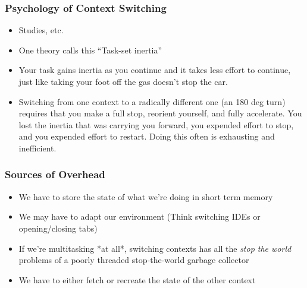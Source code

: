 \documentclass{beamer}
\begin{document}


\begin{frame}
\frametitle{Psychology of Context Switching}
\begin{itemize}
  \item Studies, etc.
  \item One theory calls this ``Task-set inertia''
  \item Your task gains inertia as you continue and it takes less effort to continue, just like taking your foot off the gas doesn't stop the car.
  \item Switching from one context to a radically different one (an 180 deg turn) requires that you make a full stop, reorient yourself, and fully accelerate. You lost the inertia that was carrying you forward, you expended effort to stop, and you expended effort to restart. Doing this often is exhausting and inefficient.
\end{itemize}
\end{frame}


\begin{frame}
\frametitle{Sources of Overhead}
\begin{itemize}
  \item We have to store the state of what we're doing in short term memory
  \item We may have to adapt our environment (Think switching IDEs or opening/closing tabs)
  \item If we're multitasking *at all*, switching contexts has all the \textit{stop the world} problems of a poorly threaded stop-the-world garbage collector
  \item We have to either fetch or recreate the state of the other context
\end{itemize}
\end{frame}
\end{document}
